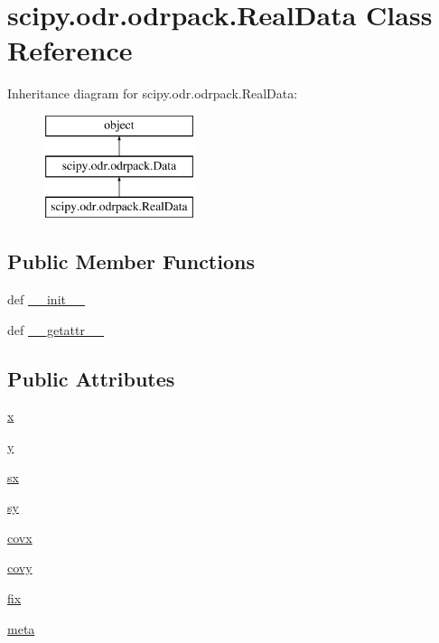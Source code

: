 \hypertarget{classscipy_1_1odr_1_1odrpack_1_1RealData}{}\section{scipy.\+odr.\+odrpack.\+Real\+Data Class Reference}
\label{classscipy_1_1odr_1_1odrpack_1_1RealData}
Inheritance diagram for scipy.\+odr.\+odrpack.\+Real\+Data\+:\begin{figure}[H]
\begin{center}
\leavevmode
\includegraphics[height=3.000000cm]{classscipy_1_1odr_1_1odrpack_1_1RealData}
\end{center}
\end{figure}
\subsection*{Public Member Functions}
\begin{DoxyCompactItemize}
\item 
def \hyperlink{classscipy_1_1odr_1_1odrpack_1_1RealData_ac0c312791efceedac9eec2bf34f19269}{\+\_\+\+\_\+init\+\_\+\+\_\+}
\item 
def \hyperlink{classscipy_1_1odr_1_1odrpack_1_1RealData_adfc07a9bf9bfedeaa4069ebc2ba63a39}{\+\_\+\+\_\+getattr\+\_\+\+\_\+}
\end{DoxyCompactItemize}
\subsection*{Public Attributes}
\begin{DoxyCompactItemize}
\item 
\hyperlink{classscipy_1_1odr_1_1odrpack_1_1RealData_a55d11a86068288d55f3d4f7566a027f7}{x}
\item 
\hyperlink{classscipy_1_1odr_1_1odrpack_1_1RealData_a3729ed46bfabdac27dffe13af65c0e10}{y}
\item 
\hyperlink{classscipy_1_1odr_1_1odrpack_1_1RealData_a0b61f9cdaabaac23a3a2a46a0719cf37}{sx}
\item 
\hyperlink{classscipy_1_1odr_1_1odrpack_1_1RealData_a56b11a5d3d7b1d9eaed36f1d9b701cb6}{sy}
\item 
\hyperlink{classscipy_1_1odr_1_1odrpack_1_1RealData_a45680b59113f26664b5a053caa31aba4}{covx}
\item 
\hyperlink{classscipy_1_1odr_1_1odrpack_1_1RealData_a2a5f97be7cf30c6123229ad4573b4d82}{covy}
\item 
\hyperlink{classscipy_1_1odr_1_1odrpack_1_1RealData_a3cb0afee6b1a7577994459b123d133f8}{fix}
\item 
\hyperlink{classscipy_1_1odr_1_1odrpack_1_1RealData_a21b450fdf7ae7eadadb7884447f9b422}{meta}
\end{DoxyCompactItemize}


